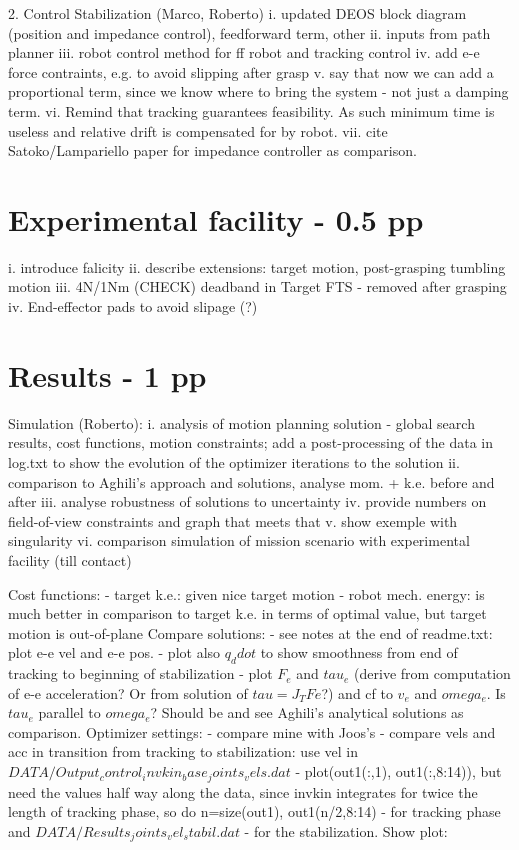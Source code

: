% 

2. Control Stabilization (Marco, Roberto)
	i. updated DEOS block diagram (position and impedance control), feedforward term, other
	ii. inputs from path planner
	iii. robot control method for ff robot and tracking control
	iv. add e-e force contraints, e.g. to avoid slipping after grasp
	v. say that now we can add a proportional term, since we know where to bring the system - not just a damping term.
	vi. Remind that tracking guarantees feasibility. As such minimum time is useless and relative drift is compensated for by robot.
	vii. cite Satoko/Lampariello paper for impedance controller as comparison.
%
\section{Experimental facility - 0.5 pp}

	
	i. introduce falicity
	ii. describe extensions: target motion, post-grasping tumbling motion
	iii. 4N/1Nm (CHECK) deadband in Target FTS - removed after grasping
	iv. End-effector pads to avoid slipage (?)

%
\section{Results - 1 pp}

Simulation (Roberto):
	i. analysis of motion planning solution - global search results, cost functions, motion constraints; add a post-processing of the data in log.txt to show the evolution of the optimizer iterations to the solution
	ii. comparison to Aghili's approach and solutions, analyse mom. + k.e. before and after
	iii. analyse robustness of solutions to uncertainty
	iv. provide numbers on field-of-view constraints and graph that meets that
	v. show exemple with singularity
	vi. comparison simulation of mission scenario with experimental facility (till contact)

Cost functions: 
	- target k.e.: given nice target motion
	- robot mech. energy: is much better in comparison to target k.e. in terms of optimal value, but target motion is out-of-plane
Compare solutions:
	- see notes at the end of readme.txt: plot e-e vel and e-e pos.
	- plot also $q_ddot$ to show smoothness from end of tracking to beginning of stabilization
	- plot $F_e$ and $tau_e$ (derive from computation of e-e acceleration? Or from solution of $tau=J_T Fe$?) and cf to $v_e$ and $omega_e$. 	Is $tau_e$ parallel to $omega_e$? Should be and see Aghili's analytical solutions as comparison.
Optimizer settings:
	- compare mine with Joos's
	- compare vels and acc in transition from tracking to stabilization: use vel in $DATA/Output_control_invkin_base_joints_vels.dat$ - 			plot(out1(:,1), out1(:,8:14)), but need the values half way along the data, since invkin integrates for twice the length of tracking 			phase, so do n=size(out1), out1(n/2,8:14)  - for tracking phase and $DATA/Results_joints_vel_stabil.dat$ - for the stabilization. Show 			plot: 
	
